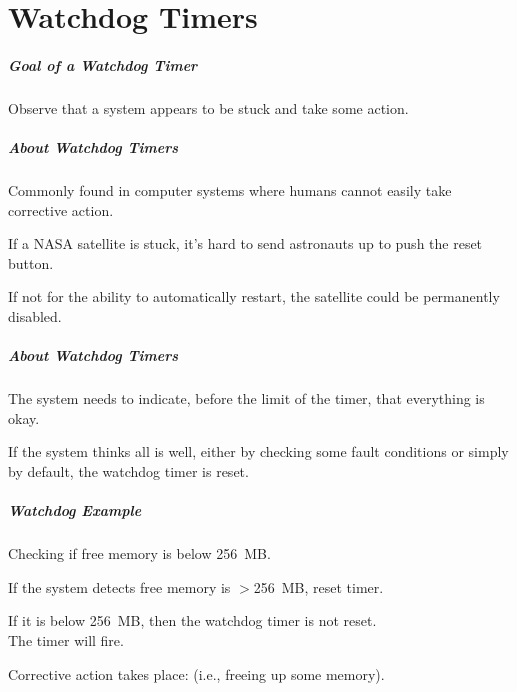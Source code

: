 \part{Watchdog Timers}
\frame{\partpage}

\begin{frame}

\frametitle{Goal of a Watchdog Timer}

\Large
\begin{changemargin}{1cm}
Observe that a system appears to
be stuck and take some action.
\end{changemargin}

\end{frame}

\begin{frame}
\frametitle{About Watchdog Timers}
\begin{changemargin}{1cm}
Commonly found in computer systems where humans cannot easily take corrective action.

If a NASA satellite is stuck, it's hard to send astronauts up to push the reset button.

If not for the ability to automatically restart, the satellite could be permanently disabled.

\end{changemargin}
\end{frame}

\begin{frame}
\frametitle{About Watchdog Timers}
\begin{changemargin}{1cm}

The system needs to indicate, before the limit of the timer, that everything is okay. 

If the system thinks all is well, either by checking some fault conditions or simply by default, the watchdog timer is reset. 


\end{changemargin}
\end{frame}


\begin{frame}
\frametitle{Watchdog Example}
\begin{changemargin}{1cm}

Checking if free memory is below 256~MB. 

If the system detects free memory is $>$256~MB, reset timer.

If it is below 256~MB, then the watchdog timer is not reset. \\
\quad The timer will fire.

Corrective action takes place: (i.e., freeing up some memory).


\end{changemargin}
\end{frame}



